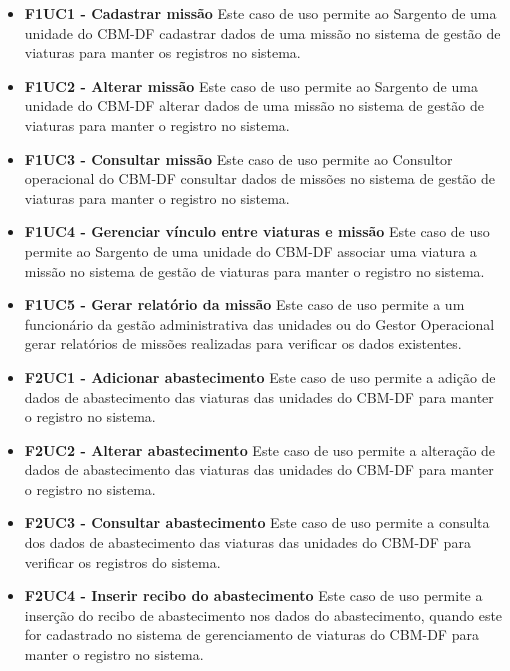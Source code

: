 \begin{itemize}

    \item \textbf{F1UC1 - Cadastrar missão}
      \subitem
      Este caso de uso permite ao Sargento de uma unidade do CBM-DF cadastrar dados de uma missão no sistema de gestão de viaturas para
      manter os registros no sistema.

    \item \textbf{F1UC2 - Alterar missão}
      \subitem
      Este caso de uso permite ao Sargento de uma unidade do CBM-DF alterar dados de uma missão no sistema de gestão de viaturas
      para manter o registro no sistema.

    \item \textbf{F1UC3 - Consultar missão}
      \subitem
      Este caso de uso permite ao Consultor operacional do CBM-DF consultar dados de missões no sistema de gestão de viaturas para
      manter o registro no sistema.

    \item \textbf{F1UC4 - Gerenciar vínculo entre viaturas e missão}
      \subitem
      Este caso de uso permite ao Sargento de uma unidade do CBM-DF associar uma viatura a missão no sistema de gestão de viaturas 
      para manter o registro no sistema.

    \item \textbf{F1UC5 - Gerar relatório da missão}
      \subitem
      Este caso de uso permite a um funcionário da gestão administrativa das unidades ou do Gestor Operacional gerar relatórios de
      missões realizadas para verificar os dados existentes.

    \item \textbf{F2UC1 - Adicionar abastecimento}
      \subitem
      Este caso de uso permite a adição de dados de abastecimento das viaturas das unidades do CBM-DF para manter o registro no sistema.

    \item \textbf{F2UC2 - Alterar abastecimento}
      \subitem
      Este caso de uso permite a alteração de dados de abastecimento das viaturas das unidades do CBM-DF para manter o registro no sistema.

    \item \textbf{F2UC3 - Consultar abastecimento}
      \subitem
      Este caso de uso permite a consulta dos dados de abastecimento das viaturas das unidades do CBM-DF para verificar os registros
      do sistema.

    \item \textbf{F2UC4 - Inserir recibo do abastecimento}
      \subitem
      Este caso de uso permite a inserção do recibo de abastecimento nos dados do abastecimento, quando este for cadastrado no 
      sistema de gerenciamento de viaturas do CBM-DF para manter o registro no sistema.


\end{itemize}
